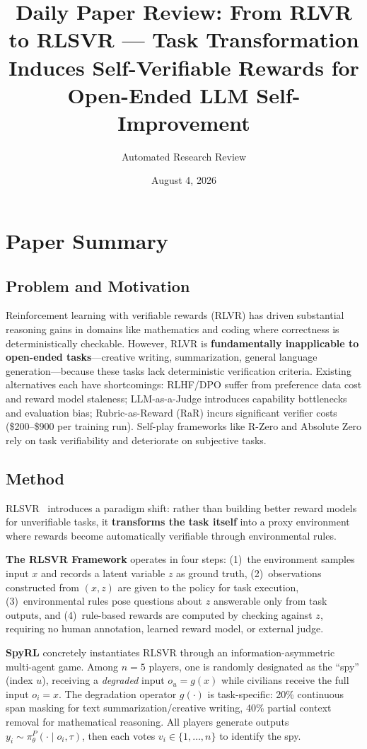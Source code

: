 \documentclass[11pt,a4paper]{article}
\title{Daily Paper Review: From RLVR to RLSVR --- Task Transformation Induces Self-Verifiable Rewards for Open-Ended LLM Self-Improvement}
\author{Automated Research Review}
\date{August 4, 2026}
\begin{document}
\maketitle

\section{Paper Summary}

\subsection{Problem and Motivation}
Reinforcement learning with verifiable rewards (RLVR) has driven substantial reasoning gains in domains like mathematics and coding where correctness is deterministically checkable. However, RLVR is \textbf{fundamentally inapplicable to open-ended tasks}---creative writing, summarization, general language generation---because these tasks lack deterministic verification criteria. Existing alternatives each have shortcomings: RLHF/DPO suffer from preference data cost and reward model staleness; LLM-as-a-Judge introduces capability bottlenecks and evaluation bias; Rubric-as-Reward (RaR) incurs significant verifier costs (\$200--\$900 per training run). Self-play frameworks like R-Zero and Absolute Zero rely on task verifiability and deteriorate on subjective tasks.

\subsection{Method}
RLSVR~\cite{wang2026rlsvr} introduces a paradigm shift: rather than building better reward models for unverifiable tasks, it \textbf{transforms the task itself} into a proxy environment where rewards become automatically verifiable through environmental rules.

\textbf{The RLSVR Framework} operates in four steps: (1)~the environment samples input $x$ and records a latent variable $z$ as ground truth, (2)~observations constructed from $(x, z)$ are given to the policy for task execution, (3)~environmental rules pose questions about $z$ answerable only from task outputs, and (4)~rule-based rewards are computed by checking against $z$, requiring no human annotation, learned reward model, or external judge.

\textbf{SpyRL} concretely instantiates RLSVR through an information-asymmetric multi-agent game. Among $n = 5$ players, one is randomly designated as the ``spy'' (index $u$), receiving a \emph{degraded} input $o_u = g(x)$ while civilians receive the full input $o_i = x$. The degradation operator $g(\cdot)$ is task-specific: 20\% continuous span masking for text summarization/creative writing, 40\% partial context removal for mathematical reasoning. All players generate outputs $y_i \sim \pi_\theta^P(\cdot \mid o_i, \tau)$, then each votes $v_i \in \{1, \ldots, n\}$ to identify the spy.
\end{document}

